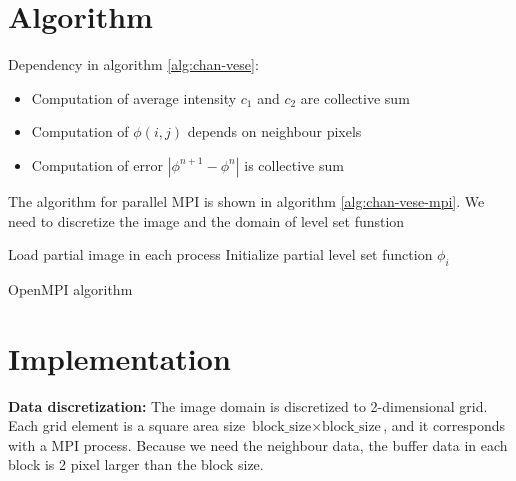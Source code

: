 
\section{Algorithm}
Dependency in algorithm \ref{alg:chan-vese}:
\begin{itemize}
    \item Computation of average intensity $c_1$ and $c_2$ are collective sum
    \item Computation of $\phi(i, j)$ depends on neighbour pixels
    \item Computation of error $|\phi^{n+1} - \phi^n|$ is collective sum
\end{itemize}

\noindent The algorithm for parallel MPI is shown in algorithm \ref{alg:chan-vese-mpi}. We need to discretize the image and the domain of level set funstion 

\begin{algorithm}[!htb]
    \DontPrintSemicolon
    Load partial image in each process
    Initialize partial level set function $\phi_i$ \;
    
    \caption{OpenMPI algorithm}
    \label{alg:chan-vese-mpi}
\end{algorithm}

\section{Implementation}
\textbf{Data discretization:} The image domain is discretized to 2-dimensional grid. Each grid element is a square area size $\text{block\_size} \times \text{block\_size}$, and it corresponds with a MPI process. Because we need the neighbour data, the buffer data in each block is 2 pixel larger than the block size.

